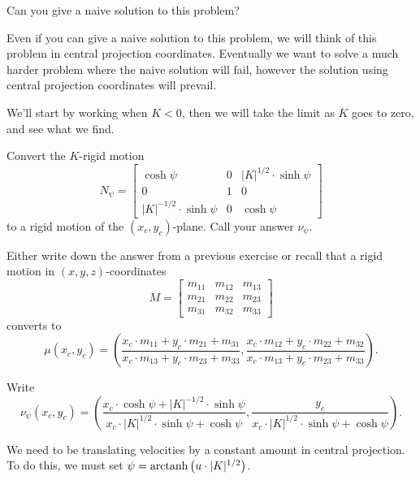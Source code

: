 \documentclass{ximera}
\begin{document}
\begin{problem}
  Can you give a naive solution to this problem?
\end{problem}
Even if you can give a naive solution to this problem, we will think
of this problem in central projection coordinates. Eventually we want
to solve a much harder problem where the naive solution will fail,
however the solution using central projection coordinates will
prevail. 

We'll start by working when $K<0$, then we will take the limit as $K$
goes to zero, and see what we find.

\begin{problem}
  Convert the $K$-rigid motion
  \[
  N_\psi=\begin{bmatrix}
  \cosh\psi & 0 & |K|^{1/2}\cdot\sinh\psi\\
  0 & 1 & 0\\
  |K|^{-1/2}\cdot\sinh\psi & 0 & \cosh\psi
\end{bmatrix}
  \]
  to a rigid motion of the $(x_c,y_c)$-plane. Call your answer $\nu_\psi$.
  \begin{hint}
    Either write down the answer from a previous exercise or recall
    that a rigid motion in $(x,y,z)$-coordinates
    \[
    M=\begin{bmatrix}
    m_{11} & m_{12} & m_{13}\\
    m_{21} & m_{22} & m_{23}\\
    m_{31} & m_{32} & m_{33}
    \end{bmatrix}
    \]
    converts to
    \[
    \mu(x_c,y_c) = \left(
    \frac{x_c\cdot m_{11} + y_c\cdot m_{21} + m_{31}}{x_c\cdot m_{13} + y_c\cdot m_{23} + m_{33}},
    \frac{x_c\cdot m_{12} + y_c\cdot m_{22} + m_{32}}{x_c\cdot m_{13} + y_c\cdot m_{23} + m_{33}}
    \right).
    \]
  \end{hint}
  \begin{freeResponse}
    Write
    \[
    \nu_\psi(x_c,y_c) = \left(\frac{x_c\cdot\cosh\psi+|K|^{-1/2}\cdot\sinh\psi}{x_c\cdot|K|^{1/2}\cdot\sinh\psi+\cosh\psi},\frac{y_c}{x_c\cdot|K|^{1/2}\cdot\sinh\psi+\cosh\psi}\right).
    \]
  \end{freeResponse}
\end{problem}

We need to be translating velocities by a constant amount in central
projection. To do this, we must set $\psi =\operatorname{arctanh}\left(u\cdot|K|^{1/2}\right)$.
\end{document}

